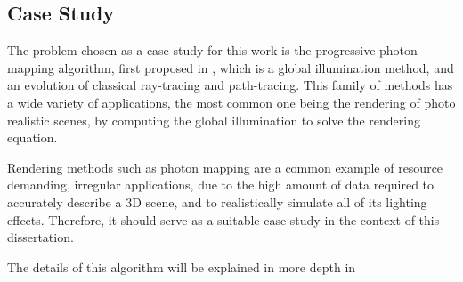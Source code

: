 \documentclass[main.tex]{subfiles}
\begin{document}
\subsection{Case Study}

The problem chosen as a case-study for this work is the progressive photon mapping algorithm, first proposed in \cite{hachisuka2008progressive}, which is a global illumination method, and an evolution of classical ray-tracing and path-tracing. This family of methods has a wide variety of applications, the most common one being the rendering of photo realistic scenes, by computing the global illumination to solve the rendering equation.

Rendering methods such as photon mapping are a common example of resource demanding, irregular applications, due to the high amount of data required to accurately describe a 3D scene, and to realistically simulate all of its lighting effects. Therefore, it should serve as a suitable case study in the context of this dissertation.

The details of this algorithm will be explained in more depth in 
\end{document}
